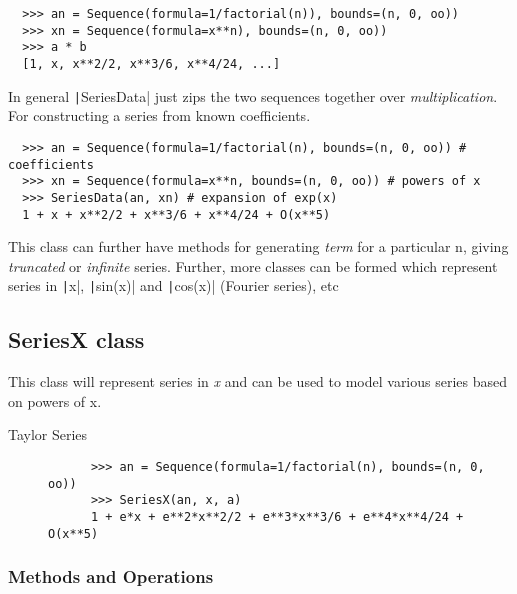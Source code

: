 \documentclass[a4paper,12pt]{article}
\newcommand{\pyline}[1]{\texttt|#1|}
\begin{document}
\begin{verbatim}
  >>> an = Sequence(formula=1/factorial(n)), bounds=(n, 0, oo))
  >>> xn = Sequence(formula=x**n), bounds=(n, 0, oo))
  >>> a * b
  [1, x, x**2/2, x**3/6, x**4/24, ...]
\end{verbatim}

In general \pyline{SeriesData} just zips the two sequences together
over \emph{multiplication}. For constructing a series from known
coefficients.

\begin{verbatim}
  >>> an = Sequence(formula=1/factorial(n), bounds=(n, 0, oo)) # coefficients
  >>> xn = Sequence(formula=x**n, bounds=(n, 0, oo)) # powers of x
  >>> SeriesData(an, xn) # expansion of exp(x)
  1 + x + x**2/2 + x**3/6 + x**4/24 + O(x**5)
\end{verbatim}

This class can further have methods for generating
\textit{term} for a particular n, giving \textit{truncated} or
\textit{infinite} series. Further, more classes can be formed which represent series in \pyline{x}, \pyline{sin(x)} and \pyline{cos(x)} (Fourier series), etc

\subsection{SeriesX class}

This class will represent series in \emph{x} and can be used to model various series based on powers of x.

\begin{description}
  \item [Taylor Series]\cite{taylor}
    \begin{verbatim}
      >>> an = Sequence(formula=1/factorial(n), bounds=(n, 0, oo))
      >>> SeriesX(an, x, a)
      1 + e*x + e**2*x**2/2 + e**3*x**3/6 + e**4*x**4/24 + O(x**5)
    \end{verbatim}
\end{description}

\subsubsection{Methods and Operations}
\end{document}
